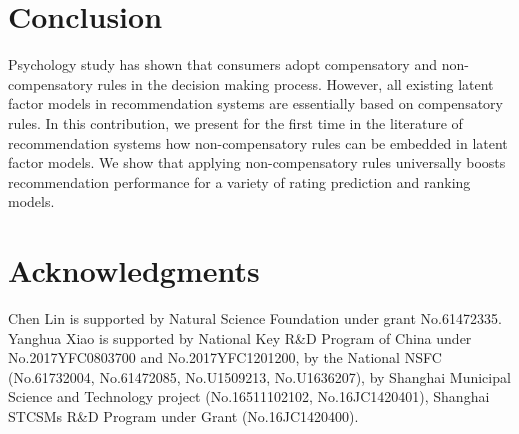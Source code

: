 \documentclass[letterpaper]{article} %
\begin{document}
\section{Conclusion}\label{sec:conclusion}
Psychology study has shown that consumers adopt compensatory and non-compensatory rules in the decision making process. However, all existing latent factor models in recommendation systems are essentially based on compensatory rules. In this contribution, we present for the first time in the literature of recommendation systems how non-compensatory rules can be embedded in latent factor models. We show that applying non-compensatory rules universally boosts recommendation performance for a variety of rating prediction and ranking models. 

\section{ Acknowledgments}
Chen Lin is supported by Natural Science Foundation under grant No.61472335. Yanghua Xiao is supported by National Key R\&D Program of China under No.2017YFC0803700 and No.2017YFC1201200, by the National NSFC (No.61732004, No.61472085, No.U1509213, No.U1636207), by Shanghai Municipal Science and Technology project (No.16511102102, No.16JC1420401), Shanghai STCSMs R\&D Program under Grant (No.16JC1420400).


\end{document}
